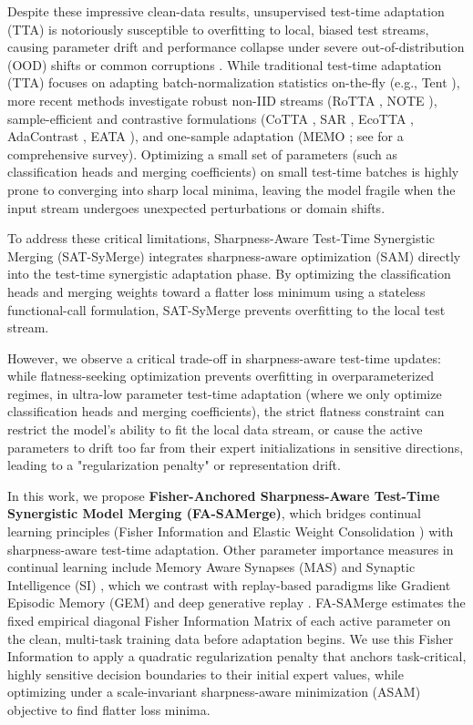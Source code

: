 \documentclass{article}
\theoremstyle{plain}
\theoremstyle{definition}
\theoremstyle{remark}
\begin{document}
Despite these impressive clean-data results, unsupervised test-time adaptation (TTA) is notoriously susceptible to overfitting to local, biased test streams, causing parameter drift and performance collapse under severe out-of-distribution (OOD) shifts or common corruptions \cite{Hendrycks2019}. While traditional test-time adaptation (TTA) focuses on adapting batch-normalization statistics on-the-fly (e.g., Tent \cite{Wang2021}), more recent methods investigate robust non-IID streams (RoTTA \cite{Yuan2023}, NOTE \cite{Gong2022}), sample-efficient and contrastive formulations (CoTTA \cite{Wang2022continual}, SAR \cite{Niu2023}, EcoTTA \cite{Song2023}, AdaContrast \cite{Chen2022}, EATA \cite{Niu2022}), and one-sample adaptation (MEMO \cite{Zhang2022memo}; see \cite{Liang2023survey} for a comprehensive survey). Optimizing a small set of parameters (such as classification heads and merging coefficients) on small test-time batches is highly prone to converging into sharp local minima, leaving the model fragile when the input stream undergoes unexpected perturbations or domain shifts.

To address these critical limitations, Sharpness-Aware Test-Time Synergistic Merging (SAT-SyMerge) integrates sharpness-aware optimization (SAM) directly into the test-time synergistic adaptation phase. By optimizing the classification heads and merging weights toward a flatter loss minimum using a stateless functional-call formulation, SAT-SyMerge prevents overfitting to the local test stream.

However, we observe a critical trade-off in sharpness-aware test-time updates: while flatness-seeking optimization prevents overfitting in overparameterized regimes, in ultra-low parameter test-time adaptation (where we only optimize classification heads and merging coefficients), the strict flatness constraint can restrict the model's ability to fit the local data stream, or cause the active parameters to drift too far from their expert initializations in sensitive directions, leading to a "regularization penalty" or representation drift.

In this work, we propose \textbf{Fisher-Anchored Sharpness-Aware Test-Time Synergistic Model Merging (FA-SAMerge)}, which bridges continual learning principles (Fisher Information and Elastic Weight Consolidation \cite{Kirkpatrick2017}) with sharpness-aware test-time adaptation. Other parameter importance measures in continual learning include Memory Aware Synapses (MAS) \cite{Aljundi2018} and Synaptic Intelligence (SI) \cite{Zenke2017}, which we contrast with replay-based paradigms like Gradient Episodic Memory (GEM) \cite{LopezPaz2017, Chaudhry2019} and deep generative replay \cite{Shin2017}. FA-SAMerge estimates the fixed empirical diagonal Fisher Information Matrix of each active parameter on the clean, multi-task training data before adaptation begins. We use this Fisher Information to apply a quadratic regularization penalty that anchors task-critical, highly sensitive decision boundaries to their initial expert values, while optimizing under a scale-invariant sharpness-aware minimization (ASAM) objective to find flatter loss minima.
\end{document}
